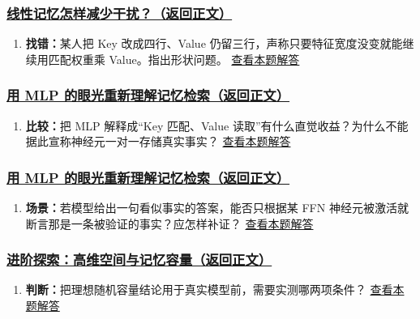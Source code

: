 \subsubsection*{\hyperref[check:08-stacking-key-value]{线性记忆怎样减少干扰？（返回正文）}}\begin{enumerate}[label={},leftmargin=4.8em,itemsep=4pt]
\item[\textbf{C4-47.}] \label{exercise:C4-47}\label{extension:08-stacking-key-value:4}\textbf{找错：}某人把 Key 改成四行、Value 仍留三行，声称只要特征宽度没变就能继续用匹配权重乘 Value。指出形状问题。 \hyperref[answerpiece:08-stacking-key-value:4]{查看本题解答}
\end{enumerate}

\subsubsection*{\hyperref[check:09-nonlinearity-and-memory]{用 MLP 的眼光重新理解记忆检索（返回正文）}}\begin{enumerate}[label={},leftmargin=4.8em,itemsep=4pt]
\item[\textbf{C4-48.}] \label{exercise:C4-48}\label{extension:09-nonlinearity-and-memory:4}\textbf{比较：}把 MLP 解释成“Key 匹配、Value 读取”有什么直觉收益？为什么不能据此宣称神经元一对一存储真实事实？ \hyperref[answerpiece:09-nonlinearity-and-memory:4]{查看本题解答}
\end{enumerate}

\subsubsection*{\hyperref[check:14-summary]{用 MLP 的眼光重新理解记忆检索（返回正文）}}\begin{enumerate}[label={},leftmargin=4.8em,itemsep=4pt]
\item[\textbf{C4-49.}] \label{exercise:C4-49}\label{extension:14-summary:4}\textbf{场景：}若模型给出一句看似事实的答案，能否只根据某 FFN 神经元被激活就断言那是一条被验证的事实？应怎样补证？ \hyperref[answerpiece:14-summary:4]{查看本题解答}
\end{enumerate}

\subsubsection*{\hyperref[check:13-capacity]{进阶探索：高维空间与记忆容量（返回正文）}}\begin{enumerate}[label={},leftmargin=4.8em,itemsep=4pt]
\item[\textbf{C4-50.}] \label{exercise:C4-50}\label{extension:13-capacity:4}\textbf{判断：}把理想随机容量结论用于真实模型前，需要实测哪两项条件？ \hyperref[answerpiece:13-capacity:4]{查看本题解答}
\end{enumerate}

